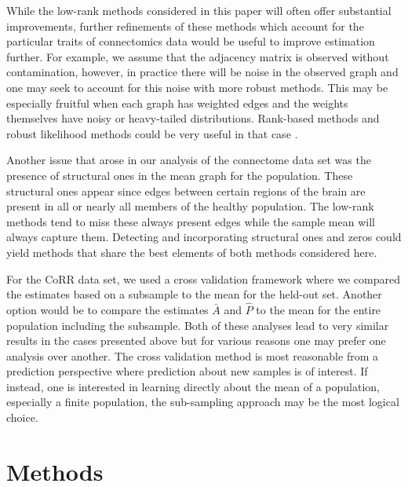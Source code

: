 \documentclass[10pt,letterpaper]{article}
\begin{document}
While the low-rank methods considered in this paper will often offer substantial improvements, further refinements of these methods which account for the particular traits of connectomics data would be useful to improve estimation further.
For example, we assume that the adjacency matrix is observed without contamination, however, in practice there will be noise in the observed graph and one may seek to account for this noise with more robust methods.
This may be especially fruitful when each graph has weighted edges and the weights themselves have noisy or heavy-tailed distributions.
Rank-based methods and robust likelihood methods could be very useful in that case \citep{huber2009robust,qin2013maximum}. 


Another issue that arose in our analysis of the connectome data set was the presence of structural ones in the mean graph for the population. 
These structural ones appear since edges between certain regions of the brain are present in all or nearly all members of the healthy population. 
The low-rank methods tend to miss these always present edges while the sample mean will always capture them.
Detecting and incorporating structural ones and zeros could yield methods that share the best elements of both methods considered here.

For the CoRR data set, we used a cross validation framework where we compared the estimates based on a subsample to the mean for the held-out set. 
Another option would be to compare the estimates $\bar{A}$ and $\hat{P}$ to the mean for the entire population including the subsample.
Both of these analyses lead to very similar results in the cases presented above but for various reasons one may prefer one analysis over another.
The cross validation method is most reasonable from a prediction perspective where prediction about new samples is of interest.
If instead, one is interested in learning directly about the mean of a population, especially a finite population, the sub-sampling approach may be the most logical choice.

\section{Methods}
\label{sec:method}
\end{document}
